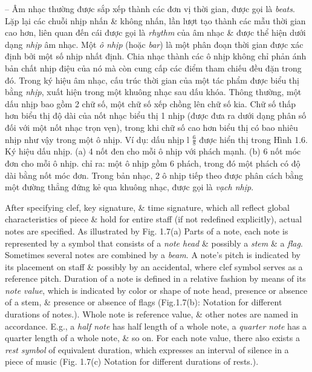 \documentclass{article}
\begin{document}
\begin{itemize}
\begin{itemize}
\begin{itemize}
			-- Âm nhạc thường được sắp xếp thành các đơn vị thời gian, được gọi là {\it beats}. Lặp lại các chuỗi nhịp nhấn \& không nhấn, lần lượt tạo thành các mẫu thời gian cao hơn, liên quan đến cái được gọi là {\it rhythm} của âm nhạc \& được thể hiện dưới dạng {\it nhịp} âm nhạc. Một {\it ô nhịp} (hoặc {\it bar}) là một phân đoạn thời gian được xác định bởi một số nhịp nhất định. Chia nhạc thành các ô nhịp không chỉ phản ánh bản chất nhịp điệu của nó mà còn cung cấp các điểm tham chiếu đều đặn trong đó. Trong ký hiệu âm nhạc, cấu trúc thời gian của một tác phẩm được biểu thị bằng {\it nhịp}, xuất hiện trong một khuông nhạc sau dấu khóa. Thông thường, một dấu nhịp bao gồm 2 chữ số, một chữ số xếp chồng lên chữ số kia. Chữ số thấp hơn biểu thị độ dài của nốt nhạc biểu thị 1 nhịp (được đưa ra dưới dạng phân số đối với một nốt nhạc trọn vẹn), trong khi chữ số cao hơn biểu thị có bao nhiêu nhịp như vậy trong một ô nhịp. Ví dụ: dấu nhịp l $\frac{6}{8}$ được hiển thị trong {\sf Hình 1.6. Ký hiệu dấu nhịp. (a) 4 nốt đen cho mỗi ô nhịp với phách mạnh. (b) 6 nốt móc đơn cho mỗi ô nhịp.} chỉ ra: một ô nhịp gồm 6 phách, trong đó một phách có độ dài bằng nốt móc đơn. Trong bản nhạc, 2 ô nhịp tiếp theo được phân cách bằng một đường thẳng đứng kẻ qua khuông nhạc, được gọi là {\it vạch nhịp}.
			
			After specifying clef, key signature, \& time signature, which all reflect global characteristics of piece \& hold for entire staff (if not redefined explicitly), actual notes are specified. As illustrated by {\sf Fig. 1.7(a) Parts of a note}, each note is represented by a symbol that consists of a {\it note head} \& possibly a {\it stem} \& a {\it flag}. Sometimes several notes are combined by a {\it beam}. A note's pitch is indicated by its placement on staff \& possibly by an accidental, where clef symbol serves as a reference pitch. Duration of a note is defined in a relative fashion by means of its {\it note value}, which is indicated by color or shape of note head, presence or absence of a stem, \& presence or absence of flags ({\sf Fig.1.7(b): Notation for different durations of notes.}). Whole note is reference value, \& other notes are named in accordance. E.g., a {\it half note} has half length of a whole note, a {\it quarter note} has a quarter length of a whole note, \& so on. For each note value, there also exists a {\it rest symbol} of equivalent duration, which expresses an interval of silence in a piece of music ({\sf Fig. 1.7(c) Notation for different durations of rests.}).


\end{itemize}
\end{itemize}
\end{itemize}
\end{document}
